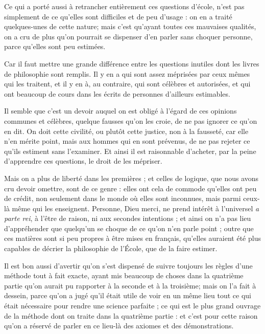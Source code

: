 Ce qui a porté aussi à retrancher entièrement ces questions d'école, n'est pas simplement de ce qu'elles sont difficiles et de peu d'usage : on en a traité quelques-unes de cette nature; mais c'est qu'ayant toutes ces mauvaises qualités, on a cru de plus qu'on pourrait se dispenser d'en parler sans choquer personne, parce qu'elles sont peu estimées.

Car il faut mettre une grande différence entre les questions inutiles dont les livres de philosophie sont remplis. Il y en a qui sont assez méprisées par ceux mêmes qui les traitent, et il y en à, au contraire, qui sont célèbres et autorisées, et qui ont beaucoup de cours dans les écrits de personnes d'ailleurs estimables.

Il semble que c'est un devoir auquel on est obligé à l'égard de ces opinions communes et célèbres, quelque fausses qu'on les croie, de ne pas ignorer ce qu'on en dit. On doit cette civilité, ou plutôt cette justice, non à la fausseté, car elle n'en mérite point, mais aux hommes qui en sont prévenus, de ne pas rejeter ce qu'ils estiment sans l'examiner. Et ainsi il est raisonnable d'acheter, par la peine d'apprendre ces questions, le droit de les mépriser.

Mais on a plus de liberté dans les premières ; et celles de logique, que nous avons cru devoir omettre, sont de ce genre : elles ont cela de commode qu'elles ont peu de crédit, non seulement dans le monde où elles sont inconnues, mais parmi ceux-là même qui les enseignent. Personne, Dieu merci, ne prend intérêt à l'universel \emph{a parte rei}, à l'être de raison, ni aux secondes intentions ; et ainsi on n'a pas lieu d'appréhender que quelqu'un se choque de ce qu'on n'en parle point ; outre que ces matières sont si peu propres à être mises en français, qu'elles auraient été plus capables de décrier la philosophie de l'École, que de la faire estimer.

Il est bon aussi d'avertir qu'on s'est dispensé de suivre toujours les règles d'une méthode tout à fait exacte, ayant mis beaucoup de choses dans la quatrième partie qu'on aurait pu rapporter à la seconde et à la troisième; mais on l'a fait à dessein, parce qu'on a jugé qu'il était utile de voir en un même lieu tout ce qui était nécessaire pour rendre une science parfaite ; ce qui est le plus grand ouvrage de la méthode dont on traite dans la quatrième partie : et c'est pour cette raison qu'on a réservé de parler en ce lieu-là des axiomes et des démonstrations.

